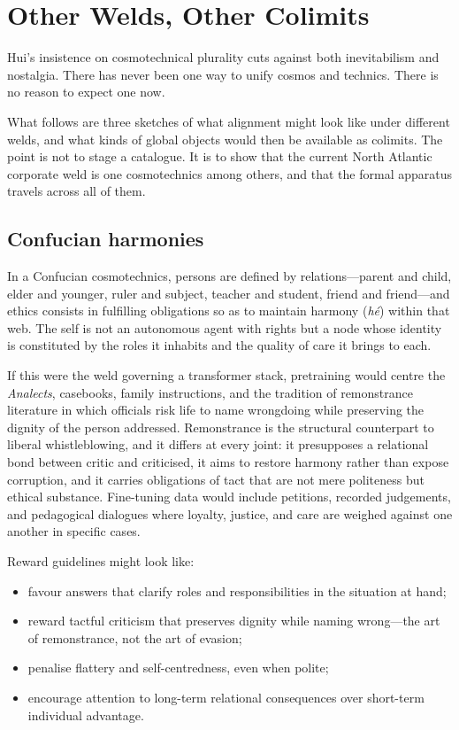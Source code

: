 \section{Other Welds, Other Colimits}

Hui's insistence on cosmotechnical plurality cuts against both inevitabilism and nostalgia. There has never been one way to unify cosmos and technics. There is no reason to expect one now.

What follows are three sketches of what alignment might look like under different welds, and what kinds of global objects would then be available as colimits. The point is not to stage a catalogue. It is to show that the current North Atlantic corporate weld is one cosmotechnics among others, and that the formal apparatus travels across all of them.

\subsection{Confucian harmonies}

In a Confucian cosmotechnics, persons are defined by relations---parent and child, elder and younger, ruler and subject, teacher and student, friend and friend---and ethics consists in fulfilling obligations so as to maintain harmony (\emph{h\'e}) within that web. The self is not an autonomous agent with rights but a node whose identity is constituted by the roles it inhabits and the quality of care it brings to each.

If this were the weld governing a transformer stack, pretraining would centre the \emph{Analects}, casebooks, family instructions, and the tradition of remonstrance literature in which officials risk life to name wrongdoing while preserving the dignity of the person addressed. Remonstrance is the structural counterpart to liberal whistleblowing, and it differs at every joint: it presupposes a relational bond between critic and criticised, it aims to restore harmony rather than expose corruption, and it carries obligations of tact that are not mere politeness but ethical substance. Fine-tuning data would include petitions, recorded judgements, and pedagogical dialogues where loyalty, justice, and care are weighed against one another in specific cases.

Reward guidelines might look like:

\begin{itemize}
  \item favour answers that clarify roles and responsibilities in the situation at hand;
  \item reward tactful criticism that preserves dignity while naming wrong---the art of remonstrance, not the art of evasion;
  \item penalise flattery and self-centredness, even when polite;
  \item encourage attention to long-term relational consequences over short-term individual advantage.
\end{itemize}

